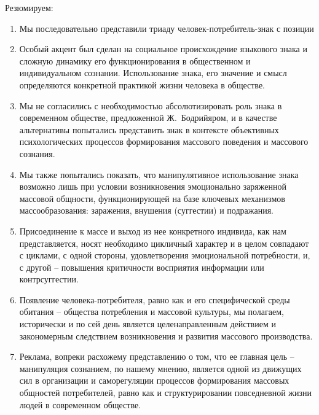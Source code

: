 Резюмируем:
\begin{enumerate}
\item Мы последовательно представили триаду человек-потребитель-знак с позиции
\item Особый акцент был сделан на социальное происхождение языкового знака и
  сложную динамику его функционирования в общественном и индивидуальном
  сознании. Использование знака, его значение и смысл определяются конкретной
  практикой жизни человека в обществе.
\item Мы не согласились с необходимостью абсолютизировать роль знака в
  современном обществе, предложенной Ж.~Бодрийяром, и в качестве альтернативы
  попытались представить знак в контексте объективных психологических
  процессов формирования массового поведения и массового сознания.
\item Мы также попытались показать, что манипулятивное использование знака
  возможно лишь при условии возникновения эмоционально заряженной
  массовой общности, функционирующей на базе ключевых механизмов массообразования:
  заражения, внушения (суггестии) и подражания.
\item Присоединение к массе и выход из нее конкретного индивида,
  как нам представляется, носят необходимо цикличный характер и в целом совпадают с циклами, с одной стороны, удовлетворения эмоциональной потребности,
  и, с другой -- повышения критичности восприятия информации или контрсуггестии.
\item Появление человека-потребителя, равно как и его специфической среды
  обитания -- общества потребления и массовой культуры, мы полагаем, исторически
  и по сей день является целенаправленным действием и закономерным
  следствием возникновения и развития массового производства.
\item Реклама, вопреки расхожему представлению о том, что ее главная цель --
  манипуляция сознанием, по нашему мнению, является одной из движущих сил
  в организации и саморегуляции процессов формирования массовых общностей
  потребителей, равно как и структурировании повседневной жизни людей в
  современном обществе.
\end{enumerate}

